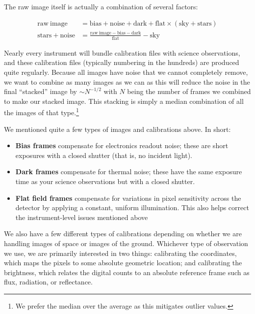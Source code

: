\documentclass{tufte-book}
\begin{document}
The raw image itself is actually a combination of several factors:%

\begin{align}
    \mathrm{raw~image} &= \mathrm{bias+noise+dark+flat\times(sky+stars) } \\
    \mathrm{stars + noise} &= \frac{\mathrm{raw~image-bias-dark}}{\mathrm{flat}}-\mathrm{sky}
\end{align}

Nearly every instrument will bundle calibration files with science observations, and these calibration files (typically numbering in the hundreds) are produced quite regularly. Because all images have noise that we cannot completely remove, we want to combine as many images as we can as this will reduce the noise in the final ``stacked'' image by $\sim N^{-{1}/{2}}$ with $N$ being the number of frames we combined to make our stacked image. This stacking is simply a median combination of all the images of that type.\footnote{We prefer the median over the average as this mitigates outlier values.}

We mentioned quite a few types of images and calibrations above. In short: 

\begin{itemize}
    \item 
        \textbf{Bias frames} compensate for electronics readout noise; these are short exposures with a closed shutter (that is, no incident light).
    \item 
        \textbf{Dark frames} compensate for thermal noise; these have the same exposure time as your science observations but with a closed shutter.
    \item 
        \textbf{Flat field frames} compensate for variations in pixel sensitivity across the detector by applying a constant, uniform illumination. This also helps correct the instrument-level issues mentioned above
\end{itemize}

We also have a few different types of calibrations depending on whether we are handling images of space or images of the ground. Whichever type of observation we use, we are primarily interested in two things: calibrating the coordinates, which maps the pixels to some absolute geometric location; and calibrating the brightness, which relates the digital counts to an absolute reference frame such as flux, radiation, or reflectance.
\end{document}
